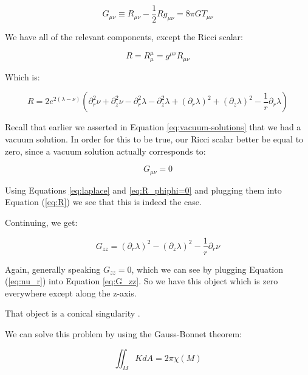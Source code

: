 \documentclass{article}
\begin{document}
\begin{equation}
G_{\mu\nu}\equiv R_{\mu\nu}-\frac{1}{2}Rg_{\mu\nu}=8\pi GT_{\mu\nu}\label{eq:einstein}
\end{equation}

We have all of the relevant components, except the Ricci scalar:

\begin{equation}
R=R_{\mu}^{\mu}=g^{\mu\nu}R_{\mu\nu}
\end{equation}

Which is:

\begin{equation}
R=2e^{2\left(\lambda-\nu\right)}\left(\partial^{2}_{r}\nu+\partial^{2}_{z}\nu-\partial^{2}_{r}\lambda-\partial^{2}_{z}\lambda+\left(\partial_{r}\lambda\right)^{2}+\left(\partial_{z}\lambda\right)^{2}-\frac{1}{r}\partial_{r}\lambda\right)\label{eq:R}
\end{equation}

Recall that earlier we asserted in Equation \eqref{eq:vacuum-solutions} that we had a vacuum solution. In order for this to be true, our Ricci scalar better be equal to zero, since a vacuum solution actually corresponds to:

\begin{equation}
G_{\mu\nu}=0
\end{equation}

Using Equations \eqref{eq:laplace} and \eqref{eq:R_phiphi=0} and plugging them into Equation (\ref{eq:R}) we see that this is indeed the case.

Continuing, we get:

\begin{equation}
G_{zz}=\left(\partial_{r}\lambda\right)^{2}-\left(\partial_{z}\lambda\right)^{2}-\frac{1}{r}\partial_{r}\nu \label{eq:G_zz}
\end{equation}

Again, generally speaking $G_{zz}=0$, which we can see by plugging Equation (\ref{eq:nu_r}) into Equation \eqref{eq:G_zz}. So we have this object which is zero everywhere except along the z-axis.

That object is a conical singularity \cite{araujo_static_1995}.

We can solve this problem by using the Gauss-Bonnet theorem: \cite{weisstein_gauss-bonnet}

\begin{equation}
\iint_{M} KdA=2\pi\chi (M)\label{eq:Gauss-Bonnet}
\end{equation}
\end{document}
